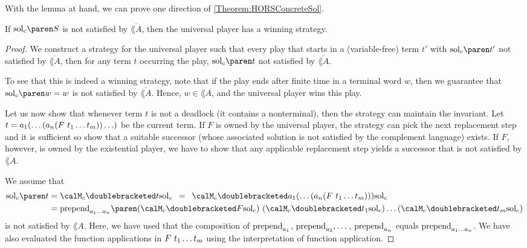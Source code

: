 \documentclass[../../diss.tex]{subfiles}
\begin{document}
With the lemma at hand, we can prove one direction of \cref{Theorem:HORSConcreteSol}.


\begin{proposition}%
\label{Proposition:HORSConcreteSolUniversal}%
    If $\solc{S}$ is not satisfied by $\overline{\lang{A}}$, then the universal player has a winning strategy.
\end{proposition}

\begin{proof}
    We construct a strategy for the universal player such that every play that starts in a (variable-free) term $t'$ with $\solc{t'}$ not satisfied by $\overline{\lang{A}}$, then for any term $t$ occurring the play, $\solc{t}$ not satisfied by $\overline{\lang{A}}$.

    To see that this is indeed a winning strategy, note that if the play ends after finite time in a terminal word $w$, then we guarantee that $\solc{w} = w$ is not satisfied by $\overline{\lang{A}}$.
    Hence, $w \in \lang{A}$, and the universal player wins this play.

    Let us now show that whenever term $t$ is not a deadlock (\ie it contains a nonterminal), then the strategy can maintain the invariant.
    Let $t = a_1(\ldots(a_n(F \  t_1 \ldots t_m)) \ldots)$ be the current term.
    If $F$ is owned by the universal player, the strategy can pick the next replacement step and it is sufficient so show that a suitable successor (whose associated solution is not satisfied by the complement language) exists.
    If $F$, however, is owned by the existential player, we have to show that any applicable replacement step yields a successor that is not satisfied by $\overline{\lang{A}}$.

    We assume that
    \begin{align*}
        \solc{t}
        &=
        \semc{t}{\solc}
        \enspace = \enspace
        \semc{a_1(\ldots(a_n(F \appl t_1 \ldots t_m)))}{\solc}
        \\
        &=\prepend{a_1 \ldots a_n}{
            (\semc{F}{\solc})
            \appl
            (\semc{t_1}{\solc})%
            \ldots
            (\semc{t_m}{\solc})
        }
    \end{align*}
    is not satisfied by $\lang{A}$.
    Here, we have used that the composition of $\prepend{a_1}$, $\prepend{a_2}, \ldots\,$, $\prepend{a_n}$ equals $\prepend{a_1 \ldots a_n}$.
    We have also evaluated the function applications in $F \  t_1 \ldots t_m$ using the interpretation of function application.


\end{proof}
\end{document}
